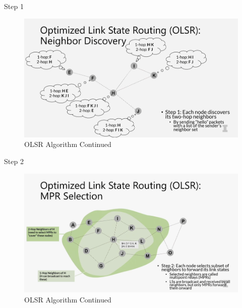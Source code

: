 \documentclass[11pt]{beamer}              %
\begin{document}
\begin{frame}{Step 1}

    \begin{figure}
        \centering
        \includegraphics[width=\textwidth]{figures/olsr8.png}
        \caption{OLSR Algorithm Continued \cite{coursera}}
    \end{figure}    
    
\end{frame}

\begin{frame}{Step 2}

    \begin{figure}
        \centering
        \includegraphics[width=\textwidth]{figures/olsr9.png}
        \caption{OLSR Algorithm Continued \cite{coursera}}
    \end{figure}    
    
\end{frame}
\end{document}
